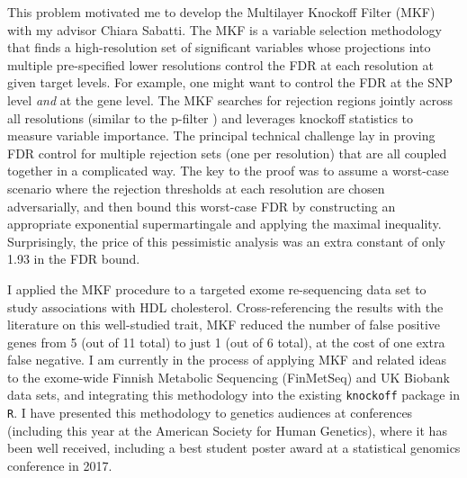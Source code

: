 \documentclass[11pt]{article}
\begin{document}
This problem motivated me to develop the Multilayer Knockoff Filter (MKF) \cite{MKF} with my advisor Chiara Sabatti. The MKF is a variable selection methodology that finds a high-resolution set of significant variables whose projections into multiple pre-specified lower resolutions control the FDR at each resolution at given target levels. For example, one might want to control the FDR at the SNP level \textit{and} at the gene level. The MKF searches for rejection regions jointly across all resolutions (similar to the p-filter \cite{p-filter}) and leverages knockoff statistics to measure variable importance. The principal technical challenge lay in proving FDR control for multiple rejection sets (one per resolution) that are all coupled together in a complicated way. The key to the proof was to assume a worst-case scenario where the rejection thresholds at each resolution are chosen adversarially, and then bound this worst-case FDR by constructing an appropriate exponential supermartingale and applying the maximal inequality. Surprisingly, the price of this pessimistic analysis was an extra constant of only 1.93 in the FDR bound. 

I applied the MKF procedure to a targeted exome re-sequencing data set to study associations with HDL cholesterol. Cross-referencing the results with the literature on this well-studied trait, MKF reduced the number of false positive genes from 5 (out of 11 total) to just 1 (out of 6 total), at the cost of one extra false negative. I am currently in the process of applying MKF and related ideas to the exome-wide Finnish Metabolic Sequencing (FinMetSeq) and UK Biobank data sets, and integrating this methodology into the existing \texttt{knockoff} package in \texttt{R}. I have presented this methodology to genetics audiences at conferences (including this year at the American Society for Human Genetics), where it has been well received, including a best student poster award at a statistical genomics conference in 2017.
\end{document}
